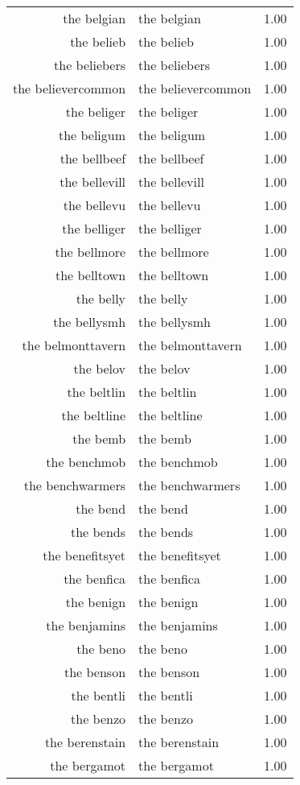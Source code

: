 \begin{table}[ht]
\begin{tabular}{rlr}
  the belgian & the belgian & 1.00 \\ 
  the belieb & the belieb & 1.00 \\ 
  the beliebers & the beliebers & 1.00 \\ 
  the believercommon & the believercommon & 1.00 \\ 
  the beliger & the beliger & 1.00 \\ 
  the beligum & the beligum & 1.00 \\ 
  the bellbeef & the bellbeef & 1.00 \\ 
  the bellevill & the bellevill & 1.00 \\ 
  the bellevu & the bellevu & 1.00 \\ 
  the belliger & the belliger & 1.00 \\ 
  the bellmore & the bellmore & 1.00 \\ 
  the belltown & the belltown & 1.00 \\ 
  the belly & the belly & 1.00 \\ 
  the bellysmh & the bellysmh & 1.00 \\ 
  the belmonttavern & the belmonttavern & 1.00 \\ 
  the belov & the belov & 1.00 \\ 
  the beltlin & the beltlin & 1.00 \\ 
  the beltline & the beltline & 1.00 \\ 
  the bemb & the bemb & 1.00 \\ 
  the benchmob & the benchmob & 1.00 \\ 
  the benchwarmers & the benchwarmers & 1.00 \\ 
  the bend & the bend & 1.00 \\ 
  the bends & the bends & 1.00 \\ 
  the benefitsyet & the benefitsyet & 1.00 \\ 
  the benfica & the benfica & 1.00 \\ 
  the benign & the benign & 1.00 \\ 
  the benjamins & the benjamins & 1.00 \\ 
  the beno & the beno & 1.00 \\ 
  the benson & the benson & 1.00 \\ 
  the bentli & the bentli & 1.00 \\ 
  the benzo & the benzo & 1.00 \\ 
  the berenstain & the berenstain & 1.00 \\ 
  the bergamot & the bergamot & 1.00 \\ 

\end{tabular}
\end{table}
